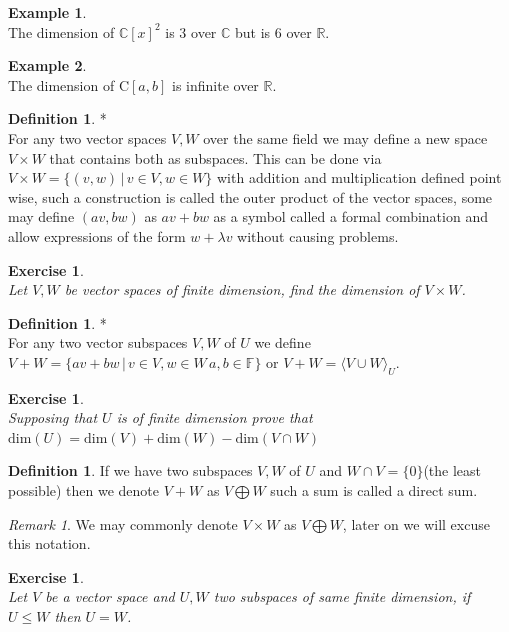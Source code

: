\documentclass[12pt]{article}
\newcommand{\double}{\hspace{2pt}}
\theoremstyle{definition}
\newtheorem{definition}[theorem]{Definition}
\newtheorem*{example}{Example}
\theoremstyle{remark}
\newtheorem*{remark}{Remark}
\theoremstyle{plain}
\newtheorem{ex}[subsubsection]{Exercise}
\begin{document}
\begin{example}\leavevmode \\
    The dimension of $\mathbb{C}[x]^2$ is $3$ over $\mathbb{C}$ but is $6$ over $\mathbb{R}$.
\end{example}
\begin{example}\leavevmode \\
    The dimension of $\mathrm{C}[a,b]$ is infinite over $\mathbb{R}$.
\end{example}
\begin{definition}*\leavevmode \\
    For any two vector spaces $V,W$ over the same field we may define a new space $V\times W$ that contains both as subspaces. This can be done via $V\times W=\{ (v,w) \double | \double v\in V, w\in W\}$ with addition and multiplication defined point wise, such a construction is called the outer product of the vector spaces, some may define $(av,bw)$ as $av+bw$ as a symbol called a formal combination and allow expressions of the form $w+\lambda v$ without causing problems.
\end{definition}
\begin{ex}\leavevmode \\
    Let $V,W$ be vector spaces of finite dimension, find the dimension of $V\times W$.
\end{ex}
\begin{definition}*\leavevmode \\
    For any two vector subspaces $V,W$ of $U$ we define $V+ W=\{ av+bw \double | \double v\in V, w\in W \double a,b\in \mathbb{F}\}$ or $V+W=\langle V \cup W\rangle_U$.
\end{definition}
\begin{ex}\leavevmode \\
    Supposing that $U$ is of finite dimension prove that $\mathrm{dim}(U)=\mathrm{dim}(V)+\mathrm{dim}(W)-\mathrm{dim}(V\cap W)$
\end{ex}
\begin{definition}
    If we have two subspaces $V,W$ of $U$ and $W\cap V=\{0\}$(the least possible) then we denote $V+W$ as $V\bigoplus W$ such a sum is called a direct sum.
\end{definition}
\begin{remark}
    We may commonly denote $V\times W$ as $V\bigoplus W$, later on we will excuse this notation.
\end{remark}
\begin{ex}\leavevmode \\
    Let $V$ be a vector space and $U,W$ two subspaces of same finite dimension, if $U\leq W$ then $U=W$.
\end{ex}
\newpage
\end{document}

